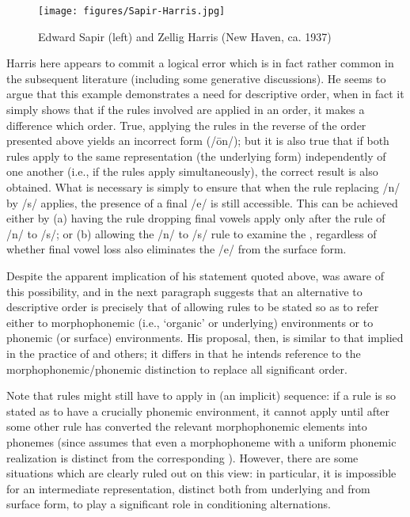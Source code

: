 \begin{wrapfigure}{r}{.4\textwidth}
  \texttt{[image: figures/Sapir-Harris.jpg]}
  \caption{Edward Sapir (left) and Zellig Harris (New Haven, ca. 1937)}
  \label{fig:ch.structuralists.sapir_harris}
\end{wrapfigure}
Harris here appears to commit a logical error which is in fact rather
common in the subsequent literature (including some generative
discussions). He seems to argue that this example demonstrates a need
for descriptive order, when in fact it simply shows that if the rules
involved are applied in an order, it makes a difference which
order. \citep[For some discussion of such cases,
see][ch. 5.]{sra74:orgphon} True, applying the rules in the reverse of
the order presented above yields an incorrect form (/ōn/); but it is
also true that if both rules apply to the same representation (the
underlying form) independently of one another (i.e., if the rules
apply simultaneously), the correct result is also obtained. What is
necessary is simply to ensure that when the rule replacing /n/ by /s/
applies, the presence of a final /e/ is still accessible. This can be
achieved either by (a) having the rule dropping final vowels apply
only after the rule of /n/ to /s/; or (b) allowing the /n/ to /s/ rule
to examine the , regardless of whether final
vowel loss also eliminates the /e/ from the surface form.

Despite the apparent implication of his statement quoted above, {\Harris}
was a\-ware of this possibility, and in the next paragraph suggests that
an alternative to descriptive order is precisely that of allowing
rules to be stated so as to refer either to morphophonemic (i.e.,
`organic' or underlying) environments or to phonemic (or surface)
environments. His proposal, then, is similar to that implied in the
practice of {\Sapir} and others; it differs in that he intends reference
to the morphophonemic/phonemic distinction to replace all significant
order.

Note that rules might still have to apply in (an implicit) sequence:
if a rule is so stated as to have a crucially phonemic environment, it
cannot apply until after some other rule has converted the relevant
morphophonemic elements into phonemes (since {\Harris} assumes that even
a morphophoneme with a uniform phonemic realization is distinct from
the corresponding ). However, there are some situations which
are clearly ruled out on this view: in particular, it is impossible
for an intermediate representation, distinct both from underlying and
from surface form, to play a significant role in conditioning
alternations.

